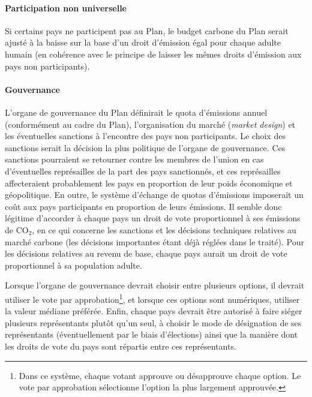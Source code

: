\documentclass[a5paper,french,openany]{memoir}
\begin{document}
\paragraph{Participation non universelle}
Si certains pays ne participent pas au Plan, le budget carbone du Plan serait ajusté à la baisse sur la base d'un droit d'émission égal pour chaque adulte humain (en cohérence avec le principe de laisser les mêmes droits d'émission aux pays non participants).

\paragraph{Gouvernance} 
L'organe de gouvernance du Plan définirait le quota d'émissions annuel (conformément au cadre du Plan), l'organisation du marché (\textit{market design}) et les éventuelles sanctions à l'encontre des pays non participants. %
Le choix des sanctions serait la décision la plus politique de l'organe de gouvernance. Ces sanctions pourraient se retourner contre les membres de l'union en cas d'éventuelles représailles de la part des pays sanctionnés, et ces représailles affecteraient probablement les pays en proportion de leur poids économique et géopolitique. 
En outre, le système d'échange de quotas d'émissions imposerait un coût aux pays participants en proportion de leurs émissions. Il semble donc légitime d'accorder à chaque pays un droit de vote proportionnel à ses émissions de CO$_\text{2}$, en ce qui concerne les sanctions et les décisions techniques relatives au marché carbone (les décisions importantes étant déjà réglées dans le traité). 
Pour les décisions relatives au revenu de base, chaque pays aurait un droit de vote proportionnel à sa population adulte. 

Lorsque l'organe de gouvernance devrait choisir entre plusieurs options, il devrait utiliser le vote par approbation\footnote{Dans ce système, chaque votant approuve ou désapprouve chaque option. Le vote par approbation sélectionne l'option la plus largement approuvée.}, et lorsque ces options sont numériques, utiliser la valeur médiane préférée. Enfin, chaque pays devrait être autorisé à faire siéger plusieurs représentants plutôt qu'un seul, à choisir le mode de désignation de ses représentants (éventuellement par le biais d'élections) ainsi que la manière dont les droits de vote du pays sont répartis entre ces représentants. 
\end{document}

